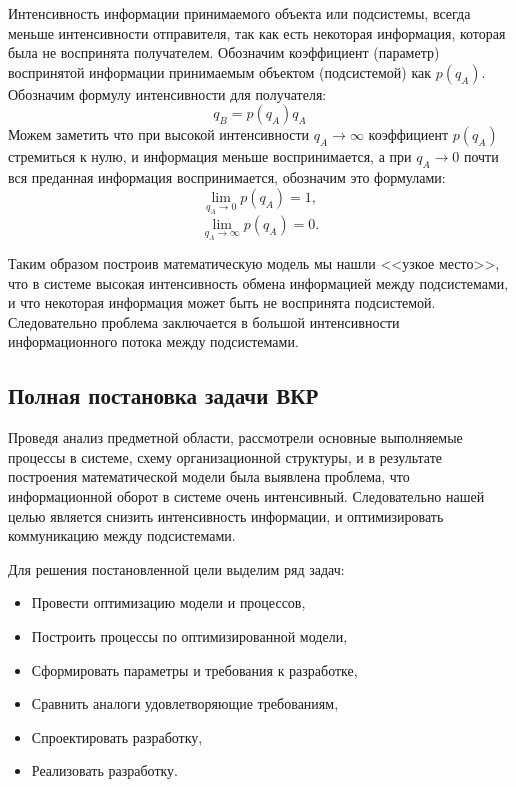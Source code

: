 Интенсивность информации принимаемого объекта или подсистемы, всегда меньше интенсивности отправителя, так как есть некоторая информация, которая была не воспринята получателем. Обозначим коэффициент (параметр) воспринятой информации принимаемым объектом (подсистемой) как $p(q_A)$. Обозначим формулу интенсивности для получателя:
\begin{equation}\label{eq:intensiveB}
q_B = p(q_A)q_A
\end{equation}
Можем заметить что при высокой интенсивности $q_A \rightarrow \infty$ коэффициент $p(q_A)$ стремиться к нулю, и информация меньше воспринимается, а при $q_A \rightarrow 0$ почти вся преданная информация воспринимается, обозначим это формулами:
\begin{equation}\label{eq:lim1}
\lim_{q_A \rightarrow 0} p(q_A) = 1,
\end{equation}
\begin{equation}\label{eq:lim0}
\lim_{q_A \rightarrow \infty} p(q_A) = 0.
\end{equation}

Таким образом построив математическую модель мы нашли <<узкое место>>, что в системе высокая интенсивность обмена информацией между подсистемами, и что некоторая информация может быть не воспринята подсистемой. Следовательно проблема заключается в большой интенсивности информационного потока между подсистемами.

\subsection{Полная постановка задачи ВКР}
Проведя анализ предметной области, рассмотрели основные выполняемые процессы в системе, схему организационной структуры, и в результате построения математической модели была выявлена проблема, что информационной оборот в системе очень интенсивный. Следовательно нашей целью является снизить интенсивность информации, и оптимизировать коммуникацию между подсистемами.

Для решения постановленной цели выделим ряд задач:
\begin{itemize}
	\item Провести оптимизацию модели и процессов,
	\item Построить процессы по оптимизированной модели,
	\item Сформировать параметры и требования к разработке,
	\item Сравнить аналоги удовлетворяющие требованиям,
	\item Спроектировать разработку,
	\item Реализовать разработку.
\end{itemize}
\pagebreak